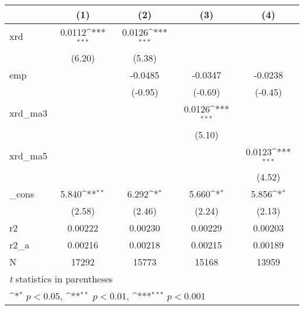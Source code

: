 {
\def\sym#1{\ifmmode^{#1}\else\(^{#1}\)\fi}
\begin{tabular}{l*{4}{c}}
\hline\hline
            &\multicolumn{1}{c}{(1)}         &\multicolumn{1}{c}{(2)}         &\multicolumn{1}{c}{(3)}         &\multicolumn{1}{c}{(4)}         \\
\hline
xrd         &      0.0112\sym{***}&      0.0126\sym{***}&                     &                     \\
            &      (6.20)         &      (5.38)         &                     &                     \\
[1em]
emp         &                     &     -0.0485         &     -0.0347         &     -0.0238         \\
            &                     &     (-0.95)         &     (-0.69)         &     (-0.45)         \\
[1em]
xrd\_ma3     &                     &                     &      0.0126\sym{***}&                     \\
            &                     &                     &      (5.10)         &                     \\
[1em]
xrd\_ma5     &                     &                     &                     &      0.0123\sym{***}\\
            &                     &                     &                     &      (4.52)         \\
[1em]
\_cons      &       5.840\sym{**} &       6.292\sym{*}  &       5.660\sym{*}  &       5.856\sym{*}  \\
            &      (2.58)         &      (2.46)         &      (2.24)         &      (2.13)         \\
\hline
r2          &     0.00222         &     0.00230         &     0.00229         &     0.00203         \\
r2\_a        &     0.00216         &     0.00218         &     0.00215         &     0.00189         \\
N           &       17292         &       15773         &       15168         &       13959         \\
\hline\hline
\multicolumn{5}{l}{\footnotesize \textit{t} statistics in parentheses}\\
\multicolumn{5}{l}{\footnotesize \sym{*} \(p<0.05\), \sym{**} \(p<0.01\), \sym{***} \(p<0.001\)}\\
\end{tabular}
}

